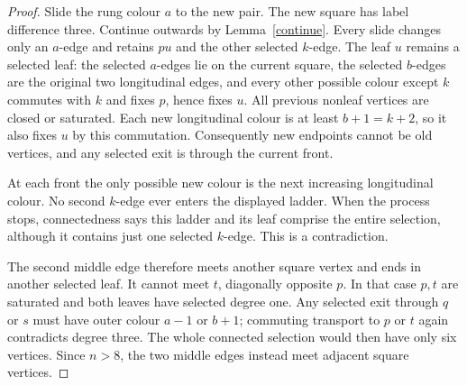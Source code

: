 \documentclass[11pt,a4paper]{article}
\begin{document}
\begin{proof}
Slide the rung colour $a$ to the new pair. The new square
has label difference three. Continue outwards by
Lemma~\ref{continue}. Every slide changes only an
$a$-edge and retains $pu$ and the other selected $k$-edge.
The leaf $u$ remains a selected leaf: the selected
$a$-edges lie on the current square, the selected $b$-edges
are the original two longitudinal edges, and every other
possible colour except $k$ commutes with $k$ and fixes $p$,
hence fixes $u$. All previous nonleaf vertices are closed
or saturated. Each new longitudinal colour is at least
$b+1=k+2$, so it also fixes $u$ by this commutation.
Consequently new endpoints cannot be old vertices, and
any selected exit is through the current front.

At each front the only possible new colour is the next
increasing longitudinal colour. No second $k$-edge ever
enters the displayed ladder. When the process stops,
connectedness says this ladder and its leaf comprise
the entire selection, although it contains just one
selected $k$-edge. This is a contradiction.

The second middle edge therefore meets another square
vertex and ends in another selected leaf. It cannot meet
$t$, diagonally opposite $p$. In that case $p,t$ are
saturated and both leaves have selected degree one. Any
selected exit through $q$ or $s$ must have outer colour
$a-1$ or $b+1$; commuting transport to $p$ or $t$ again
contradicts degree three. The whole connected selection
would then have only six vertices. Since $n>8$, the two
middle edges instead meet adjacent square vertices.
\end{proof}
\end{document}
